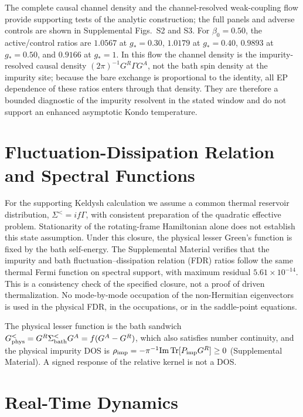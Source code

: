 \documentclass[%
  aps,physrev,onecolumn,10pt,amsmath,amssymb,superscriptaddress,longbibliography,floatfix
]{revtex4-2}
\begin{document}
The complete causal channel density and the channel-resolved weak-coupling
flow provide supporting tests of the analytic construction; the full panels
and adverse controls are shown in Supplemental Figs.~S2 and S3.  For $\beta_0=0.50$, the active/control ratios are $1.0567$ at $g_\ast=0.30$,
$1.0179$ at $g_\ast=0.40$, $0.9893$ at $g_\ast=0.50$, and $0.9166$ at
$g_\ast=1$.  In this flow the channel density is the impurity-resolved causal
density $(2\pi)^{-1}G^R\Gamma G^A$, not the bath spin density at the impurity
site; because the bare exchange is proportional to the identity, all EP
dependence of these ratios enters through that density.  They are therefore a
bounded diagnostic of the impurity resolvent in the stated window and do not
support an enhanced asymptotic Kondo temperature.

\section{Fluctuation-Dissipation Relation and Spectral Functions}
\label{sec:FDR}

For the supporting Keldysh calculation we assume a common thermal reservoir
distribution, $\Sigma^<=if\Gamma$, with consistent preparation of the
quadratic effective problem.  Stationarity of the rotating-frame Hamiltonian
alone does not establish this state assumption.  Under this closure, the
physical lesser Green's function is fixed by the bath self-energy.  The Supplemental Material verifies
that the impurity and bath fluctuation--dissipation relation (FDR) ratios
follow the same thermal Fermi function on spectral support, with maximum
residual $5.61\times10^{-14}$.  This is a consistency check of the specified closure, not a proof of driven thermalization.  No
mode-by-mode occupation of the non-Hermitian eigenvectors is used in the
physical FDR, in the occupations, or in the saddle-point equations.

The physical lesser function is the bath sandwich $G^<_{\rm phys}=G^R\Sigma^<_{\rm bath}G^A=f(G^A-G^R)$, which also satisfies number continuity, and the physical impurity DOS is $\rho_{\rm imp}=-\pi^{-1}{\rm Im\,Tr}[P_{\rm imp}G^R]\geq0$ (Supplemental Material).  A signed response of the relative kernel is not a DOS.

\section{Real-Time Dynamics}
\label{sec:dynamics}
\end{document}
